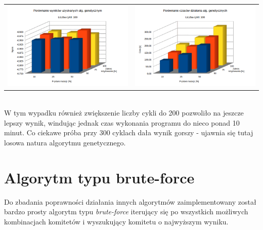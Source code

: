 \documentclass[pdflatex,11pt]{../aghdoc_version2}
\begin{document}
\begin{tabular}{cc}
\includegraphics[width=0.4\paperwidth]{pics/porownanie2/wynik100.png} & 
\includegraphics[width=0.4\paperwidth]{pics/porownanie2/czas100.png} \\
		
\end{tabular}

~ \\
W tym wypadku również zwiększenie liczby cykli do 200 pozwoliło na jeszcze lepszy wynik, windując jednak czas wykonania programu do nieco ponad 10 minut. Co ciekawe próba przy 300 cyklach dała wynik gorszy - ujawnia się tutaj losowa natura algorytmu genetycznego.

\section{Algorytm typu brute-force}
Do zbadania poprawności działania innych algorytmów zaimplementowany został bardzo prosty algorytm typu \textit{brute-force} iterujący się po wszystkich możliwych kombinacjach komitetów i wyszukujący komitetu o najwyższym wyniku.
\end{document}
